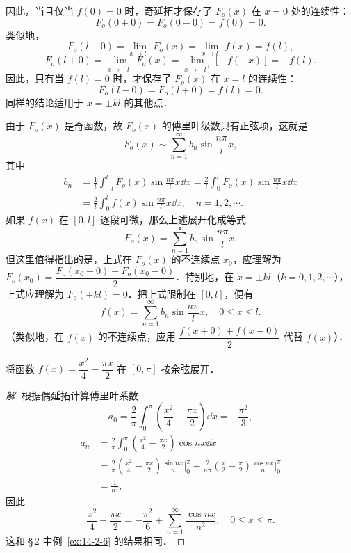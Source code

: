 因此，当且仅当 $f(0)=0$ 时，奇延拓才保存了 $F_{o}(x)$ 在 $x=0$ 处的连续性：
\[
F_{o}(0+0)=F_{o}(0-0)=f(0)=0.
\]
类似地，
\[
F_{o}(l-0)=\lim_{x\to l^{-}}F_{o}(x)=\lim_{x\to l^{-}}f(x)=f(l),
\]
\[
F_{o}(l+0)=\lim_{x\to -l^{+}}F_{o}(x)=\lim_{x\to -l^{+}}\left[-f(-x)\right]=-f(l).
\]
因此，只有当 $f(l)=0$ 时，才保存了 $F_{o}(x)$ 在 $x=l$ 的连续性：
\[
F_{o}(l-0)=F_{o}(l+0)=f(l)=0.
\]
同样的结论适用于 $x=\pm kl$ 的其他点．

由于 $F_{o}(x)$ 是奇函数，故 $F_{o}(x)$ 的傅里叶级数只有正弦项，这就是
\[
F_{o}(x)\sim\sum_{n=1}^{\infty}b_{n}\sin\frac{n\pi}{l}x,
\]
其中
\[
\begin{aligned}
b_{n}&=\frac{1}{l}\int_{-l}^{l}F_{o}(x)\sin\frac{n\pi}{l}x\dd x=\frac{2}{l}\int_{0}^{l}F_{o}(x)\sin\frac{n\pi}{l}x\dd x\\
&=\frac{2}{l}\int_{0}^{l}f(x)\sin\frac{n\pi}{l}x\dd x,\quad n=1,2,\cdots.
\end{aligned}
\]
如果 $f(x)$ 在 $[0,l]$ 逐段可微，那么上述展开化成等式
\[
F_{o}(x)=\sum_{n=1}^{\infty}b_{n}\sin\frac{n\pi}{l}x.
\]
但这里值得指出的是，上式在 $F_{o}(x)$ 的不连续点 $x_{0}$，应理解为 $F_{o}(x_{0})=\dfrac{F_{o}(x_{0}+0)+F_{o}(x_{0}-0)}{2}$．特别地，在 $x=\pm kl$（$k=0,1,2,\cdots$），上式应理解为 $F_{o}(\pm kl)=0$．把上式限制在 $[0,l]$，便有
\[
f(x)=\sum_{n=1}^{\infty}b_{n}\sin\frac{n\pi}{l}x,\quad 0\leqslant x\leqslant l.
\]
（类似地，在 $f(x)$ 的不连续点，应用 $\dfrac{f(x+0)+f(x-0)}{2}$ 代替 $f(x)$）．

\begin{example}\label{ex:14-3-1}
将函数 $f(x)=\dfrac{x^{2}}{4}-\dfrac{\pi x}{2}$ 在 $[0,\pi]$ 按余弦展开．
\end{example}

\begin{proof}[解]
根据偶延拓计算傅里叶系数
\[
a_{0}=\frac{2}{\pi}\int_{0}^{\pi}\left(\frac{x^{2}}{4}-\frac{\pi x}{2}\right)\dd x=-\frac{\pi^{2}}{3},
\]
\[
\begin{aligned}
a_{n}&=\frac{2}{\pi}\int_{0}^{\pi}\left(\frac{x^{2}}{4}-\frac{\pi x}{2}\right)\cos nx\dd x\\
&=\frac{2}{\pi}\left(\frac{x^{2}}{4}-\frac{\pi x}{2}\right)\frac{\sin nx}{n}\bigg|_{0}^{\pi}
+\frac{2}{n\pi}\left(\frac{x}{2}-\frac{\pi}{2}\right)\frac{\cos nx}{n}\bigg|_{0}^{\pi}\\
&=\frac{1}{n^{2}},
\end{aligned}
\]
因此
\[
\frac{x^{2}}{4}-\frac{\pi x}{2}=-\frac{\pi^{2}}{6}+\sum_{n=1}^{\infty}\frac{\cos nx}{n^{2}},\quad 0\leqslant x\leqslant\pi.
\]
这和 \S\,2 中例~\ref{ex:14-2-6} 的结果相同．
\end{proof}


